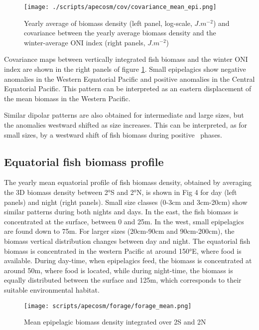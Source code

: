 \begin{figure}[h!]
    \centering
    \texttt{[image: ./scripts/apecosm/cov/covariance\_mean\_epi.png]}
    \caption{Yearly average of biomass density (left panel, log-scale, $J.m^{-2}$) and 
    covariance between the yearly average biomass density and the winter-average ONI index (right panels, $J.m^{-2}$)}
    \label{fig:mean-cov-ape}
\end{figure}

Covariance maps between vertically integrated fish biomass and the winter ONI index are shown in the right panels of figure \ref{fig:mean-cov-ape}. 
Small epipelagics show negative anomalies in the Western Equatorial Pacific and positive anomalies in the Central Equatorial Pacific. This pattern can be interpreted as an eastern displacement of the mean biomass in the Western Pacific.

Similar dipolar patterns are also obtained for intermediate and large sizes, but the anomalies westward shifted as size increases. This can be interpreted, as for small sizes, by a westward shift of fish biomass during positive \nino\ phases.

\subsection{Equatorial fish biomass profile}

The yearly mean equatorial profile of fish biomass density, obtained by averaging the 3D biomass density between 2°S and 2°N, is shown in Fig 4 for day (left panels) and night (right panels). Small size classes (0-3cm and 3cm-20cm) show similar patterns during both nights and days. In the east, the fish biomass is concentrated at the surface, between 0 and 25m. In the west, small epipelagics are found down to 75m. For larger sizes (20cm-90cm and 90cm-200cm), the biomass vertical distribution changes between day and night. The equatorial fish biomass is concentrated in the western Pacific at around 150°E, where food is available. During day-time, when epipelagics feed, the biomass is concentrated at around 50m, where food is located, while during night-time, the biomass is equally distributed between the surface and 125m, which corresponds to their suitable environmental habitat.

\begin{figure}[h!]
    \centering	
    \texttt{[image: scripts/apecosm/forage/forage\_mean.png]}
	\caption{Mean epipelagic biomass density integrated over 2\degree S and 2\degree N}
    \label{fig:mean-forage}
\end{figure}

